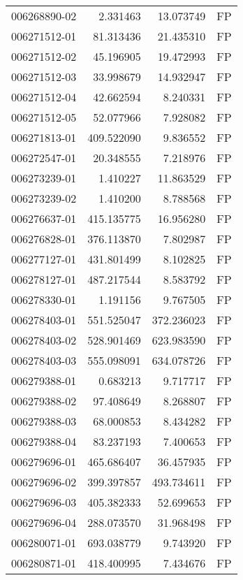 \begin{tabular}{lrrl}
006268890-02 &    2.331463 &      13.073749 &   FP \\
006271512-01 &   81.313436 &      21.435310 &   FP \\
006271512-02 &   45.196905 &      19.472993 &   FP \\
006271512-03 &   33.998679 &      14.932947 &   FP \\
006271512-04 &   42.662594 &       8.240331 &   FP \\
006271512-05 &   52.077966 &       7.928082 &   FP \\
006271813-01 &  409.522090 &       9.836552 &   FP \\
006272547-01 &   20.348555 &       7.218976 &   FP \\
006273239-01 &    1.410227 &      11.863529 &   FP \\
006273239-02 &    1.410200 &       8.788568 &   FP \\
006276637-01 &  415.135775 &      16.956280 &   FP \\
006276828-01 &  376.113870 &       7.802987 &   FP \\
006277127-01 &  431.801499 &       8.102825 &   FP \\
006278127-01 &  487.217544 &       8.583792 &   FP \\
006278330-01 &    1.191156 &       9.767505 &   FP \\
006278403-01 &  551.525047 &     372.236023 &   FP \\
006278403-02 &  528.901469 &     623.983590 &   FP \\
006278403-03 &  555.098091 &     634.078726 &   FP \\
006279388-01 &    0.683213 &       9.717717 &   FP \\
006279388-02 &   97.408649 &       8.268807 &   FP \\
006279388-03 &   68.000853 &       8.434282 &   FP \\
006279388-04 &   83.237193 &       7.400653 &   FP \\
006279696-01 &  465.686407 &      36.457935 &   FP \\
006279696-02 &  399.397857 &     493.734611 &   FP \\
006279696-03 &  405.382333 &      52.699653 &   FP \\
006279696-04 &  288.073570 &      31.968498 &   FP \\
006280071-01 &  693.038779 &       9.743920 &   FP \\
006280871-01 &  418.400995 &       7.434676 &   FP \\

\end{tabular}
